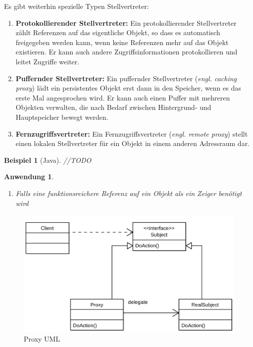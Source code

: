 \documentclass[a4paper]{article}
\theoremstyle{break}
\newtheorem{ex}{Beispiel}[section]
\newtheorem{why}{Anwendung}[section]
\begin{document}
Es gibt weiterhin spezielle Typen Stellvertreter:
\begin{enumerate}
	\item \textbf{Protokollierender Stellvertreter:}\newline
	 Ein protokollierender Stellvertreter zählt Referenzen auf das	eigentliche Objekt, so dass es automatisch freigegeben werden kann, wenn keine Referenzen mehr auf das Objekt existieren. Er kann auch andere Zugriffsinformationen protokollieren und leitet Zugriffe weiter. 
	\item \textbf{Puffernder Stellvertreter:}\newline
	Ein puffernder Stellvertreter (\textit{engl. caching proxy}) lädt ein persistentes Objekt erst dann in den Speicher, wenn es das erste Mal angesprochen wird. Er kann auch einen Puffer mit mehreren Objekten verwalten, die nach Bedarf zwischen Hintergrund- und Hauptspeicher bewegt werden.
	\item \textbf{Fernzugriffsvertreter:}\newline
	Ein Fernzugriffsvertreter (\textit{engl. remote proxy}) stellt einen lokalen Stellvertreter für ein Objekt in einem anderen Adressraum dar.
\end{enumerate} 
\begin{ex}[Java]
	//TODO
\end{ex}
\begin{why}
	\begin{enumerate}
		\item Falls eine funktionsreichere Referenz auf ein Objekt als ein Zeiger benötigt wird
	\end{enumerate}
\end{why}
\begin{figure}[H]
	\centering
	\includegraphics[width=\textwidth]{../diagrams/uml/ProxyPattern.png}
	\caption{Proxy UML}
\end{figure}
\end{document}
